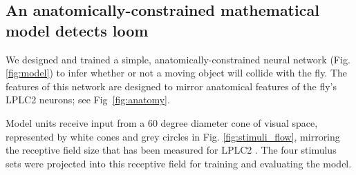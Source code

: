 \documentclass[pdftex,9pt,lineno]{elife}
\begin{document}
\begin{figure}
\label{figsupp:sf1_stimuli_flow}
\end{figure}


\subsection{An anatomically-constrained mathematical model detects loom}

We designed and trained a simple, anatomically-constrained neural network (Fig. \ref{fig:model}) to infer whether or not a moving object will collide with the fly. The features of this network are designed to mirror anatomical features of the fly's LPLC2 neurons; see Fig~\ref{fig:anatomy}.

Model units receive input from a 60 degree diameter cone of visual space, represented by white cones and grey circles in Fig. \ref{fig:stimuli_flow}, mirroring the receptive field size that has been measured for LPLC2 \citep{klapoetke2017ultra}. The four stimulus sets were projected into this receptive field for training and evaluating the model.
\end{document}
